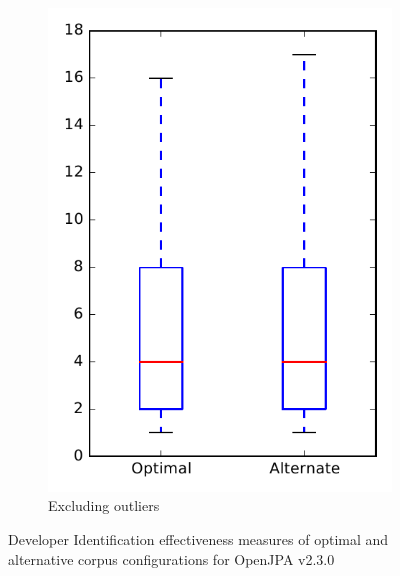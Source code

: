 \begin{figure}
\begin{subfigure}{.4\textwidth}
        \includegraphics[height=0.4\textheight]{figures/combo/dit_rq2_openjpa_no_outlier}
        \caption{Excluding outliers}\label{fig:combo:dit:rq2:openjpa_no_outlier}
    \end{subfigure}
\caption{Developer Identification effectiveness measures of optimal and alternative corpus configurations for OpenJPA v2.3.0}
\label{fig:combo:dit:rq2:openjpa}
\end{figure}
